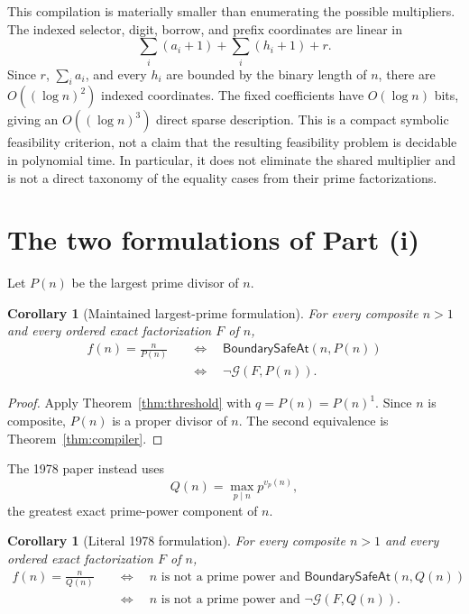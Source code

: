 \documentclass[11pt]{article}
\newtheorem{corollary}[theorem]{Corollary}
\theoremstyle{remark}
\newcommand{\BoundarySafeAt}{\mathsf{BoundarySafeAt}}
\newcommand{\GSys}{\mathcal G}
\begin{document}
This compilation is materially smaller than enumerating the possible
multipliers.  The indexed selector, digit, borrow, and prefix coordinates are
linear in
\[
 \sum_i(a_i+1)+\sum_i(h_i+1)+r.
\]
Since $r$, $\sum_i a_i$, and every $h_i$ are bounded by the binary length of
$n$, there are $O((\log n)^2)$ indexed coordinates.  The fixed coefficients
have $O(\log n)$ bits, giving an $O((\log n)^3)$ direct sparse description.
This is a compact symbolic feasibility criterion, not a claim that the
resulting feasibility problem is decidable in polynomial time.  In particular,
it does not eliminate the shared multiplier and is not a direct taxonomy of
the equality cases from their prime factorizations.

\section{The two formulations of Part (i)}

Let $P(n)$ be the largest prime divisor of $n$.

\begin{corollary}[Maintained largest-prime formulation]
For every composite $n>1$ and every ordered exact factorization $F$ of $n$,
\[
 \begin{aligned}
 f(n)=\frac{n}{P(n)}
 &\quad\Longleftrightarrow\quad \BoundarySafeAt(n,P(n))\\
 &\quad\Longleftrightarrow\quad \neg\GSys(F,P(n)).
 \end{aligned}
\]
\end{corollary}

\begin{proof}
Apply Theorem~\ref{thm:threshold} with $q=P(n)=P(n)^1$.  Since $n$ is
composite, $P(n)$ is a proper divisor of $n$.  The second equivalence is
Theorem~\ref{thm:compiler}.
\end{proof}

The 1978 paper instead uses
\[
 Q(n)=\max_{p\mid n}p^{v_p(n)},                            \tag{17}
\]
the greatest exact prime-power component of $n$.

\begin{corollary}[Literal 1978 formulation]
For every composite $n>1$ and every ordered exact factorization $F$ of $n$,
\[
 \begin{aligned}
 f(n)=\frac{n}{Q(n)}
 &\quad\Longleftrightarrow\quad
 n\text{ is not a prime power and }\BoundarySafeAt(n,Q(n))\\
 &\quad\Longleftrightarrow\quad
 n\text{ is not a prime power and }\neg\GSys(F,Q(n)).
 \end{aligned}
\]
\end{corollary}
\end{document}
